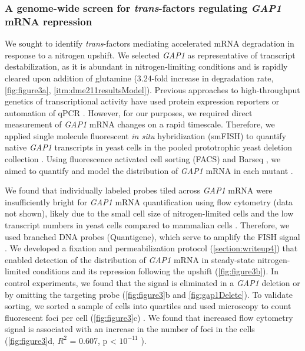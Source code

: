 {\subsubsection{A genome-wide screen for \textit{trans}-factors 
  regulating \textit{GAP1} mRNA repression}

We sought to identify \textit{trans}-factors mediating accelerated mRNA
degradation in response to a nitrogen upshift. We selected \textit{GAP1} 
as representative of transcript destabilization, as it is abundant in
nitrogen-limiting conditions and is rapidly cleared upon addition of
glutamine  (3.24-fold increase in degradation rate, \autoref{fig:figure3a},
\autoref{itm:dme211resultsModel}). Previous approaches to high-throughput
genetics of transcriptional activity have used protein expression
reporters \parencite{neklesa2009genome,sliva2016barcode} or automation of qPCR 
\parencite{worley2016genome}. However, for our
purposes, we required direct measurement of \textit{GAP1} mRNA 
changes on a rapid timescale.
Therefore, we applied single molecule fluorescent \textit{in situ}
hybridization (smFISH) to quantify 
native \textit{GAP1} transcripts in yeast cells in the pooled
prototrophic yeast deletion collection \parencite{vandersluis2014broad}.
Using fluorescence activated cell sorting (FACS) and Barseq
\parencite{smith2009quantitative,robinson2014design,giaever2014yeast},
we aimed to quantify and model the distribution of \textit{GAP1} mRNA
in each mutant \parencite{kinney2010using,peterman2016sort}.



We found that
individually labeled probes tiled across \textit{GAP1} mRNA
\parencite{raj2008imaging} were insufficiently bright for
\textit{GAP1} mRNA quantification using flow cytometry (data not shown),
likely due to the small cell size of nitrogen-limited cells and the
low transcript numbers in yeast cells compared to mammalian cells
\parencite{klemm2014transcriptional}. Therefore, we used branched DNA probes
(Quantigene), which serve to amplify the FISH signal
\parencite{hanley2013detection}. We developed a fixation and permeabilization
protocol (\autoref{section:writeup4}) that enabled detection of the
distribution of  \textit{GAP1} mRNA in steady-state nitrogen-limited conditions
and its repression following the  upshift (\autoref{fig:figure3b}). In control
experiments, we found that the signal is eliminated in a \textit{GAP1} deletion
or by omitting the targeting probe%
(\autoref{fig:figure3}b and \autoref{fig:gap1Delete}). To validate
sorting, we sorted a sample of cells into quartiles and used
microscopy to count fluorescent foci per cell
(\autoref{fig:figure3}c) .
We found that increased flow cytometry signal is associated with an
increase in the number of foci in the cells (\autoref{fig:figure3}d, $R^2$ = 0.607,
p < $10^{-11}$ ). 

}
